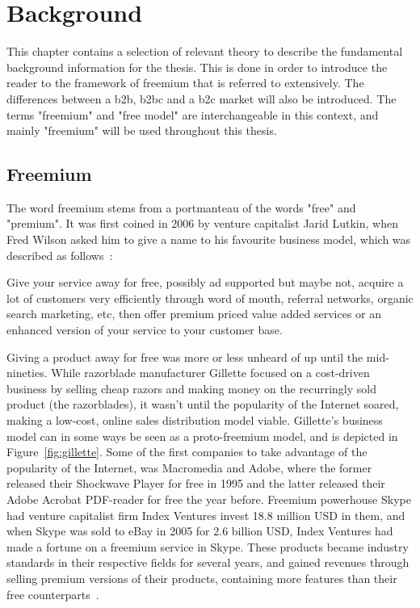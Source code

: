 \chapter{Background}
This chapter contains a selection of relevant theory to describe the fundamental background information for the thesis. This is done in order to introduce the reader to the framework of freemium that is referred to extensively. The differences between a \gls{b2b}, \gls{b2bc} and a \gls{b2c} market will also be introduced. The terms "freemium" and "free model" are interchangeable in this context, and mainly "freemium" will be used throughout this thesis.
\section{Freemium}
The word freemium stems from a portmanteau of the words "free" and "premium". It was first coined in 2006 by venture capitalist Jarid Lutkin, when Fred Wilson asked him to give a name to his favourite business model, which was described as follows~\cite{fredwilson20062}:
\begin{displayquote}
Give your service away for free, possibly ad supported but maybe not,
acquire a lot of customers very efficiently through word of mouth,
referral networks, organic search marketing, etc, then offer premium
priced value added services or an enhanced version of your service to
your customer base.
\end{displayquote}

Giving a product away for free was more or less unheard of up until the mid-nineties. While razorblade manufacturer Gillette focused on a cost-driven business by selling cheap razors and making money on the recurringly sold product (the razorblades), it wasn't until the popularity of the Internet soared, making a low-cost, online sales distribution model viable. Gillette's business model can in some ways be seen as a proto-freemium model, and is depicted in Figure~\ref{fig:gillette}. Some of the first companies to take advantage of the popularity of the Internet, was Macromedia and Adobe, where the former released their Shockwave Player for free in 1995 and the latter released their Adobe Acrobat PDF-reader for free the year before. Freemium powerhouse Skype had venture capitalist firm Index Ventures invest 18.8 million USD in them, and when Skype was sold to eBay in 2005 for 2.6 billion USD, Index Ventures had made a fortune on a freemium service in Skype.  These products became industry standards in their respective fields for several years, and gained revenues through selling premium versions of their products, containing more features than their free counterparts~\cite{katherineheires2007}. 

